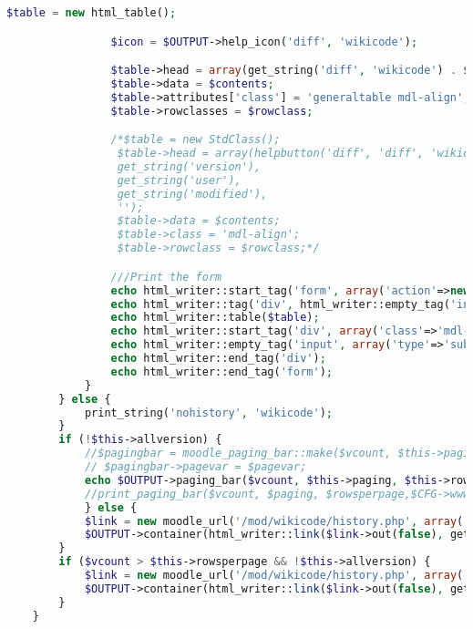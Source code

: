 \begin{lstlisting}[language=PHP]
                $table = new html_table();

                $icon = $OUTPUT->help_icon('diff', 'wikicode');

                $table->head = array(get_string('diff', 'wikicode') . $icon, get_string('version'), get_string('user'), get_string('modified'), '');
                $table->data = $contents;
                $table->attributes['class'] = 'generaltable mdl-align';
                $table->rowclasses = $rowclass;

                /*$table = new StdClass();
                 $table->head = array(helpbutton('diff', 'diff', 'wikicode', true, false, '', true, ''),
                 get_string('version'),
                 get_string('user'),
                 get_string('modified'),
                 '');
                 $table->data = $contents;
                 $table->class = 'mdl-align';
                 $table->rowclass = $rowclass;*/

                ///Print the form
                echo html_writer::start_tag('form', array('action'=>new moodle_url('/mod/wikicode/diff.php'), 'method'=>'get', 'id'=>'diff'));
                echo html_writer::tag('div', html_writer::empty_tag('input', array('type'=>'hidden', 'name'=>'pageid', 'value'=>$pageid)));
                echo html_writer::table($table);
                echo html_writer::start_tag('div', array('class'=>'mdl-align'));
                echo html_writer::empty_tag('input', array('type'=>'submit', 'class'=>'wikicode_form-button', 'value'=>get_string('comparesel', 'wikicode')));
                echo html_writer::end_tag('div');
                echo html_writer::end_tag('form');
            }
        } else {
            print_string('nohistory', 'wikicode');
        }
        if (!$this->allversion) {
            //$pagingbar = moodle_paging_bar::make($vcount, $this->paging, $this->rowsperpage, $CFG->wwwroot.'/mod/wikicode/history.php?pageid='.$pageid.'&amp;');
            // $pagingbar->pagevar = $pagevar;
            echo $OUTPUT->paging_bar($vcount, $this->paging, $this->rowsperpage, $CFG->wwwroot . '/mod/wikicode/history.php?pageid=' . $pageid . '&amp;');
            //print_paging_bar($vcount, $paging, $rowsperpage,$CFG->wwwroot.'/mod/wikicode/history.php?pageid='.$pageid.'&amp;','paging');
            } else {
            $link = new moodle_url('/mod/wikicode/history.php', array('pageid' => $pageid));
            $OUTPUT->container(html_writer::link($link->out(false), get_string('viewperpage', 'wikicode', $this->rowsperpage)), 'mdl-align');
        }
        if ($vcount > $this->rowsperpage && !$this->allversion) {
            $link = new moodle_url('/mod/wikicode/history.php', array('pageid' => $pageid, 'allversion' => 1));
            $OUTPUT->container(html_writer::link($link->out(false), get_string('viewallhistory', 'wikicode')), 'mdl-align');
        }
    }


\end{lstlisting}

